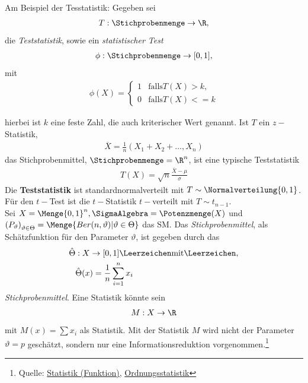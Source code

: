 Am Beispiel der Tesstatistik: Gegeben sei 
\begin{align}
	T: \Stichprobenmenge \rightarrow \R,
\end{align} die \textit{Teststatistik}, sowie ein \textit{statistischer Test}
\begin{align}
	\phi: \Stichprobenmenge \rightarrow [0,1],
\end{align}
mit 
\begin{align}
	\phi(X) = \begin{cases}
		1 & \text{falls} T(X) > k,\\
		0 & \text{falls} T(X) <= k
	\end{cases}
\end{align}

hierbei ist $k$ eine feste Zahl, die auch kriterischer Wert genannt. Ist $T$ ein $z-$Statistik, 
\begin{align}
	\overline{X} = \frac{1}{n}\left(X_1 + X_2 + \dots, X_n\right)
\end{align}
das Stichprobenmittel, $\Stichprobenmenge = \R^n$, ist eine typische Teststatistik
\begin{align}
	T(X) =\sqrt{n} \frac{\overline{X} - \mu}{\sigma}
\end{align}
Die \textbf{Teststatistik} ist standardnormalverteilt mit $T\sim \Normalverteilung{0,1}$. Für den $t-$Test ist die $t-$Statistik $t-$verteilt mit $T\sim t_{n-1}$.\\

Sei $X=\Menge{0,1}^n, \SigmaAlgebra = \Potenzmenge (X)$ und $\left(P_{\vartheta}\right)_{\vartheta \in \Theta} =\Menge{Ber(n, \vartheta)
| \vartheta \in \Theta}$ das \gls{SM}. Das \textit{Stichprobenmittel}, als Schätzfunktion für den Parameter $\vartheta$, ist gegeben durch das
\begin{align}
	\hat{\Theta}&: X \rightarrow [0,1]\Leerzeichen\text{mit}\Leerzeichen, \\
	&\hat{\Theta}(x) = \frac{1}{n}\sum_{i=1}^{n} x_i
\end{align}
\textit{Stichprobenmittel}. Eine Statistik könnte sein
\begin{align}
	M:X\rightarrow \R
\end{align}
mit $M(x)= \sum x_i$ als Statistik. Mit der Statistik $M$ wird nicht der Parameter $\vartheta = p$ geschätzt, sondern nur eine Informationsreduktion vorgenommen.\footnote{
	Quelle: \href{https://de.wikipedia.org/wiki/Statistik{\_}(Funktion)}{Statistik (Funktion)}, \href{https://de.wikipedia.org/wiki/Ordnungsstatistik}{Ordnungsstatistik}
}

